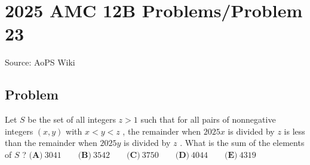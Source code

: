 \documentclass[12pt]{article}
\begin{document}
\section*{{2025 AMC 12B Problems/Problem 23}}
Source: AoPS Wiki

\subsection*{Problem}
Let $S$ be the set of all integers $z > 1$ such that for all pairs of nonnegative integers $(x, y)$ with $x < y < z$ , the remainder when $2025x$ is divided by $z$ is less than the remainder when $2025y$ is divided by $z$ . What is the sum of the elements of $S$ ? $\textbf{(A)}~3041 \qquad \textbf{(B)}~3542 \qquad \textbf{(C)}~3750 \qquad \textbf{(D)}~4044 \qquad \textbf{(E)}~4319$
\end{document}

